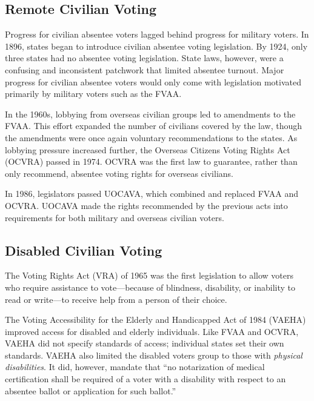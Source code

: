 \subsection{Remote Civilian Voting}

Progress for civilian absentee voters lagged behind progress for
military voters. In 1896, states began to introduce civilian absentee
voting legislation. By 1924, only three states had no absentee voting
legislation. State laws, however, were a confusing and inconsistent
patchwork that limited absentee turnout. Major progress for civilian
absentee voters would only come with legislation motivated primarily
by military voters such as the FVAA.

In the 1960s, lobbying from overseas civilian groups led to amendments
to the FVAA. This effort expanded the number of civilians covered by
the law, though the amendments were once again voluntary
recommendations to the states. As lobbying pressure increased further,
the Overseas Citizens Voting Rights Act (OCVRA) passed in 1974.  OCVRA
was the first law to guarantee, rather than only recommend, absentee
voting rights for overseas civilians.

In 1986, legislators passed UOCAVA, which combined and replaced FVAA
and OCVRA. UOCAVA made the rights recommended by the previous acts
into requirements for both military and overseas civilian voters.

\subsection{Disabled Civilian Voting}
The Voting Rights Act (VRA) of 1965 was the first legislation to allow
voters who require assistance to vote---because of blindness,
disability, or inability to read or write---to receive help from a
person of their choice.

The Voting Accessibility for the Elderly and Handicapped Act of 1984
(VAEHA) improved access for disabled and elderly individuals.  Like
FVAA and OCVRA, VAEHA did not specify standards of access; individual
states set their own standards. VAEHA also limited the disabled voters
group to those with {\em physical disabilities}. It did, however,
mandate that ``no notarization of medical certification shall be
required of a voter with a disability with respect to an absentee
ballot or application for such ballot.''

